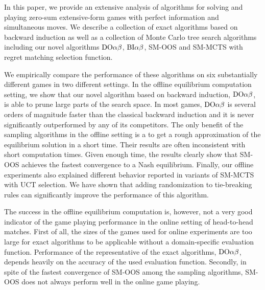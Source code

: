 
In this paper, we provide an extensive analysis of algorithms for solving and playing zero-sum extensive-form games with perfect information and simultaneous moves. We describe a collection of exact algorithms based on backward induction as well as a collection of Monte Carlo tree search algorithms including our novel algorithms $\textrm{DO}\alpha\beta$, $\textrm{BI}\alpha\beta$, SM-OOS and SM-MCTS with regret matching selection function. 

We empirically compare the performance of these algorithms on six substantially different games in two different settings. In the offline equilibrium computation setting, we show that our novel algorithm based on backward induction, $\textrm{DO}\alpha\beta$, is able to prune large parts of the search space. In most games, $\textrm{DO}\alpha\beta$ is several orders of magnitude faster than the classical backward induction and it is never significantly outperformed by any of its competitors. The only benefit of the sampling algorithms in the offline setting is a to get a rough approximation of the equilibrium solution in a short time. Their results are often inconsistent with short computation times. Given enough time, the results clearly show that SM-OOS achieves the fastest convergence to a Nash equilibrium. Finally, our offline experiments also explained different behavior reported in variants of SM-MCTS with UCT selection. We have shown that adding randomization to tie-breaking rules can significantly improve the performance of this algorithm.

The success in the offline equilibrium computation is, however, not a very good indicator of the game playing performance in the online setting of head-to-head matches. First of all, the sizes of the games used for online experiments are too large for exact algorithms to be applicable without a domain-specific evaluation function. Performance of the representative of the exact algorithms, $\textrm{DO}\alpha\beta$, depends heavily on the accuracy of the used evaluation function. Secondly, in spite of the fastest convergence of SM-OOS among the sampling algorithms, SM-OOS does not always perform well in the online game playing. 



